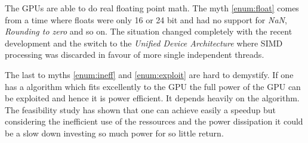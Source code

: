 The \glspl{GPU} are able to do real floating point math. The myth
\autoref{enum:float} comes from a time where floats were only 16 or 24 bit and
had no support for \emph{NaN}, \emph{Rounding to zero} and so on. The situation
changed completely with the recent development and the switch to the
\emph{Unified Device Architecture} where \gls{SIMD} processing was discarded in
favour of more single independent threads.

The last to myths \autoref{enum:ineff} and \autoref{enum:exploit} are hard to
demystify. If one has a algorithm which fits excellently to the \gls{GPU} the
full power of the \gls{GPU} can be exploited and hence it is power efficient. It
depends heavily on the algorithm. The feasibility study has shown that one can
achieve easily a speedup but considering the inefficient use of the ressources
and the power dissipation it could be a slow down investing so much power for so
little return.








